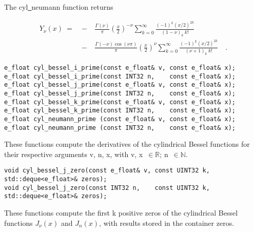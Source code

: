 \vspace{6.0pt}

 The {\courier cyl\underline\ neumann} function
returns~\cite{wolframfunctions:website}

\begin{eqnarray}
Y_{\nu}(x) \ =
&\ -\ &\frac{\Gamma(\nu)}{\pi}\left(\frac{x}{2}\right)^{-\nu}
\sum_{k=0}^{\infty} \frac{(-1)^k (x/2)^{2k}}{(1-\nu)_{k}\ k!}
\nonumber\\
&\ -\ &
\frac{\Gamma(-\nu)\cos(\nu\pi)}{\pi}\left(\frac{x}{2}\right)^{\nu}
\sum_{k=0}^{\infty} \frac{(-1)^k (x/2)^{2k}}{(\nu+1)_{k}\ k!}\quad.
\end{eqnarray}

\begin{lstlisting}
e_float cyl_bessel_i_prime(const e_float& v, const e_float& x);
e_float cyl_bessel_i_prime(const INT32 n,    const e_float& x);
e_float cyl_bessel_j_prime(const e_float& v, const e_float& x);
e_float cyl_bessel_j_prime(const INT32 n,    const e_float& x);
e_float cyl_bessel_k_prime(const e_float& v, const e_float& x);
e_float cyl_bessel_k_prime(const INT32 n,    const e_float& x);
e_float cyl_neumann_prime (const e_float& v, const e_float& x);
e_float cyl_neumann_prime (const INT32 n,    const e_float& x);
\end{lstlisting}

\vspace{6.0pt}

 These functions compute the derivatives of the cylindrical
Bessel functions for their respective arguments {\courier v}, {\courier n}, {\courier x},
with {\courier v}, {\courier x}~$\in\mathbb{R}$; {\courier n}~$\in\mathbb{N}$.

\begin{lstlisting}
void cyl_bessel_j_zero(const e_float& v, const UINT32 k, std::deque<e_float>& zeros);
void cyl_bessel_j_zero(const INT32 n,    const UINT32 k, std::deque<e_float>& zeros);
\end{lstlisting}

\vspace{6.0pt}

 These functions compute the first {\courier k} positive
zeros of the cylindrical Bessel functions $J_{\nu}(x)$ and $J_{n}(x)$,
with results stored in the container {\courier zeros}.

